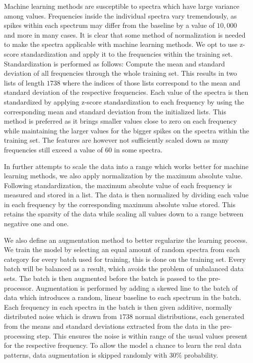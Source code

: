 Machine learning methods are susceptible to spectra which have large variance among values. Frequencies inside the individual spectra vary tremendously, as spikes within each spectrum may differ from the baseline by a value of $10,000$ and more in many cases. It is clear that some method of normalization is needed to make the spectra applicable with machine learning methods. We opt to use z-score standardization and apply it to the frequencies within the training set. Standardization is performed as follows: Compute the mean and standard deviation of all frequencies through the whole training set. This results in two lists of length $1738$ where the indices of those lists correspond to the mean and standard deviation of the respective frequencies. Each value of the spectra is then standardized by applying z-score standardization to each frequency by using the corresponding mean and standard deviation from the initialized lists. This method is preferred as it brings smaller values close to zero on each frequency while maintaining the larger values for the bigger spikes on the spectra within the training set. The features are however not sufficiently scaled down as many frequencies still exceed a value of $60$ in some spectra.

In further attempts to scale the data into a range which works better for machine learning methods, we also apply normalization by the maximum absolute value. Following standardization, the maximum absolute value of each frequency is measured and stored in a list. The data is then normalized by dividing each value in each frequency by the corresponding maximum absolute value stored. This retains the sparsity of the data while scaling all values down to a range between negative one and one.

We also define an augmentation method to better regularize the learning process. We train the model by selecting an equal amount of random spectra from each category for every batch used for training, this is done on the training set. Every batch will be balanced as a result, which avoids the problem of unbalanced data sets. The batch is then augmented before the batch is passed to the pre-processor. Augmentation is performed by adding a skewed line to the batch of data which introduces a random, linear baseline to each spectrum in the batch. Each frequency in each spectra in the batch is then given additive, normally distributed noise which is drawn from $1738$ normal distributions, each generated from the means and standard deviations extracted from the data in the pre-processing step. This ensures the noise is within range of the usual values present for the respective frequency. To allow the model a chance to learn the real data patterns, data augmentation is skipped randomly with $30\%$ probability.

